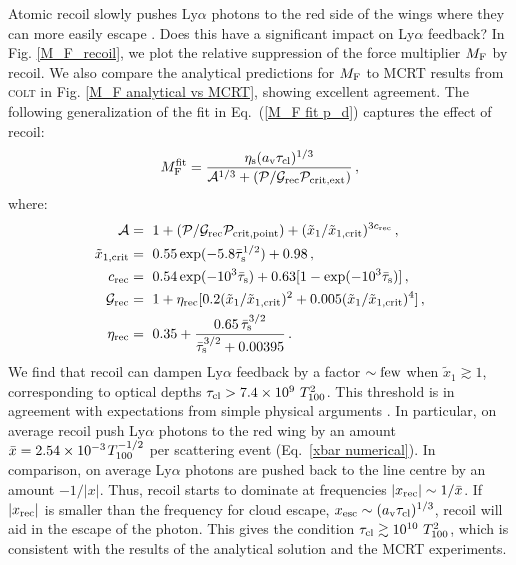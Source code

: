 \documentclass[fleqn,usenatbib]{mnras}
\newcommand{\taucl}{\tau_{\rm cl}}
\begin{document}
Atomic recoil slowly pushes Ly$\alpha$ photons to the red side of the wings where they can more easily escape \citep{Adams1971, Smith2017}. Does this have a significant impact on Ly$\alpha$ feedback? In Fig. \ref{M_F_recoil}, we plot the relative suppression of the force multiplier $M_{\rm F}$ by recoil. We also compare the analytical predictions for $M_{\rm F}$ to MCRT results from \textsc{colt} in Fig. \ref{M_F analytical vs MCRT}, showing excellent agreement. The following generalization of the fit in Eq.~(\ref{M_F fit p_d}) captures the effect of recoil:
\begin{equation}
    M_{\rm F}^{\rm fit} =  \dfrac{\eta_{\rm s} (a_{\rm v}\taucl)^{1/3}}{\mathcal{A}^{1/3} + (\mathcal{P}/\mathcal{G}_{\rm rec}\mathcal{P}_{\rm crit,ext})} \, , \label{M_F fit recoil}
\end{equation}
where:
\begin{align}
    \mathcal{A} &=~ 1 + (\mathcal{P}/\mathcal{G}_{\rm rec} \mathcal{P}_{\rm crit,point}) + (\Tilde{x}_1/\Tilde{x}_{\rm 1,crit})^{3c_{\rm rec}} \, , \\ \Tilde{x}_{\rm 1,crit} &=~ 0.55 \exp(-5.8 \Bar{\tau}_{\rm s}^{1/2}) + 0.98 \, , \\ c_{\rm rec} &=~ 0.54 \exp(-10^3 \Bar{\tau}_{\rm s}) + 0.63[1 - \exp(-10^3 \Bar{\tau}_{\rm s})] \, , \\ \mathcal{G}_{\rm rec} &=~ 1 + \eta_{\rm rec}[0.2 (\Tilde{x}_1/\Tilde{x}_{\rm 1,crit})^2 + 0.005(\Tilde{x}_1/\Tilde{x}_{\rm 1,crit})^4] \, , \\ \eta_{\rm rec} &=~ 0.35 + \dfrac{0.65 \, \Bar{\tau}_{\rm s}^{3/2}}{\Bar{\tau}_{\rm s}^{3/2} + 0.00395} \, .
\end{align}
We find that recoil can dampen Ly$\alpha$ feedback by a factor $\sim \rm few$ when $\tilde{x}_1 \gtrsim 1$, corresponding to optical depths $\taucl > 7.4 \times 10^{9} ~ T_{100}^2$. This threshold is in agreement with expectations from simple physical arguments \citep{Adams1971, Smith2017}. In particular, on average recoil push Ly$\alpha$ photons to the red wing by an amount $\Bar{x} = 2.54 \times 10^{-3} \hspace{1 pt} T_{100}^{-1/2}$ per scattering event (Eq.~\ref{xbar numerical}). In comparison, on average Ly$\alpha$ photons are pushed back to the line centre by an amount $-1/\lvert x \rvert$. Thus, recoil starts to dominate at frequencies $\lvert x_{\rm rec} \rvert \sim 1/\Bar{x}$. If $\lvert x_{\rm rec} \rvert$ is smaller than the frequency for cloud escape, $x_{\rm esc} \sim (a_{\rm v} \taucl)^{1/3}$, recoil will aid in the escape of the photon. This gives the condition $\taucl \gtrsim 10^{10} ~ T_{100}^2$, which is consistent with the results of the analytical solution and the MCRT experiments.
\end{document}
